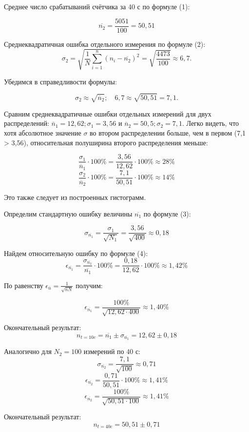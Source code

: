 Среднее число срабатываний счётчика за 40 с по формуле (1):


\[\overline{n_2} = \frac{5051}{100} = 50,51\]


Среднеквадратичная ошибка отдельного измерения по формуле (2):
\[\sigma_2 = \sqrt{\frac{1}{N}\sum\limits_{i=1}^n (n_i-\overline{n_2})^2} = \sqrt{\frac{4473}{100}} \approx 6,7.\]


Убедимся в справедливости формулы:


\[\sigma_2 \approx \sqrt{\overline{n}_2};\quad 6,7 \approx \sqrt{50,51} = 7,1.\]


Сравним среднеквадратичные ошибки отдельных измерений для двух распределений:
$\overline{n}_1 = 12,62; \sigma_1 = 3,56$ и $\overline{n}_2 = 50,5; \sigma_2 = 7,1$.
Легко видеть, что хотя абсолютное значение $\sigma$ во втором распределении больше,
чем в первом (7,1 > 3,56), относительная полуширина второго распределения меньше:


\[\frac{\sigma_1}{\overline{n}_1}\cdot100\% = \frac{3,56}{12,62}\cdot100\% \approx 28\% \]
\[\frac{\sigma_2}{\overline{n}_2}\cdot100\% = \frac{7,1}{50,51}\cdot100\% \approx 14\% \]

Это также следует из построенных гистограмм.



Определим стандартную ошибку величины $\overline{n_1}$ по формуле (3):


\[\sigma_{\overline{n_1}} = \frac{\sigma_1}{\sqrt{N_1}} = \frac{3,56}{\sqrt{400}} \approx 0,18\]


Найдем относительную ошибку по формуле (4):
\[\epsilon_{\overline{n_1}} = \frac{\sigma_{\overline{n_1}}}{\overline{n_1}}\cdot100\% = \frac{0,18}{12,62}\cdot100\% \approx 1,42\%\]


По равенству $\epsilon_{\overline{n}} = \frac{1}{\sqrt{\overline{n}N}}$ получим:


\[\epsilon_{\overline{n_1}} = \frac{100\%}{\sqrt{12,62\cdot400}} \approx 1,40\%\]


Окончательный результат:
\[n_{t=10c} = \overline{n_1} \pm \sigma_{\overline{n_1}} = 12,62 \pm 0,18\]


Аналогично для $N_2 = 100$ измерений по 40 с:
\[\sigma_{\overline{n_2}} = \frac{7,1}{\sqrt{100}} \approx 0,71\]
\[\epsilon_{\overline{n_2}} = \frac{0,71}{50,51}\cdot100\% \approx 1,41\%\]
\[\epsilon_{\overline{n_2}} = \frac{100\%}{\sqrt{50,51\cdot100}} \approx 1,41\%\]


Окончательный результат:
\[n_{t=40c} = 50,51 \pm 0,71\]




